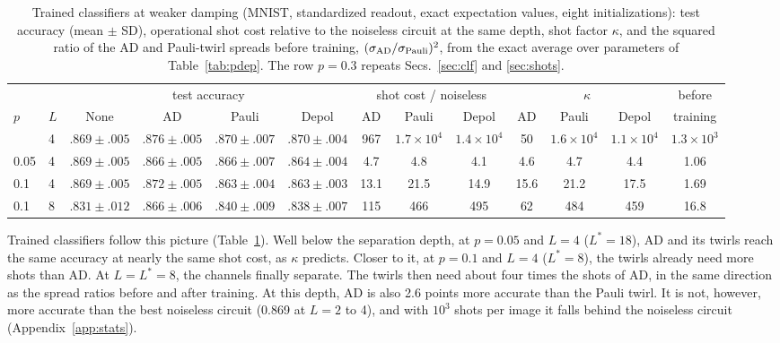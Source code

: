 \documentclass[
 aps,pra,
 twocolumn,
 superscriptaddress,
 longbibliography,
 nofootinbib
]{revtex4-2}
\newcommand{\AD}{\mathrm{AD}}
\begin{document}
\begin{table}[t]
\caption{Trained classifiers at weaker damping (MNIST, standardized readout,
exact expectation values, eight initializations): test accuracy (mean $\pm$ SD), operational
shot cost relative to the noiseless circuit at the same depth, shot factor
$\kappa$, and the squared ratio of the AD and Pauli-twirl spreads before
training, $(\sigma_{\AD}/\sigma_{\rm Pauli})^2$, from the exact average over
parameters of Table~\ref{tab:pdep}. The row $p=0.3$ repeats
Secs.~\ref{sec:clf} and \ref{sec:shots}.}
\label{tab:pdep_trained}
\begin{ruledtabular}
\begin{tabular}{llccccccccccc}
 & & \multicolumn{4}{c}{test accuracy} & \multicolumn{3}{c}{shot cost / noiseless} & \multicolumn{3}{c}{$\kappa$} & before\\
$p$ & $L$ & None & AD & Pauli & Depol & AD & Pauli & Depol & AD & Pauli & Depol & training\\
\colrule
0.3 & 4 & $.869\pm.005$ & $.876\pm.005$ & $.870\pm.007$ & $.870\pm.004$ & 967 & $1.7\times10^4$ & $1.4\times10^4$ & 50 & $1.6\times10^4$ & $1.1\times10^4$ & $1.3\times10^3$\\
0.05 & 4 & $.869\pm.005$ & $.866\pm.005$ & $.866\pm.007$ & $.864\pm.004$ & 4.7 & 4.8 & 4.1 & 4.6 & 4.7 & 4.4 & 1.06\\
0.1 & 4 & $.869\pm.005$ & $.872\pm.005$ & $.863\pm.004$ & $.863\pm.003$ & 13.1 & 21.5 & 14.9 & 15.6 & 21.2 & 17.5 & 1.69\\
0.1 & 8 & $.831\pm.012$ & $.866\pm.006$ & $.840\pm.009$ & $.838\pm.007$ & 115 & 466 & 495 & 62 & 484 & 459 & 16.8\\
\end{tabular}
\end{ruledtabular}
\end{table}

Trained classifiers follow this picture (Table~\ref{tab:pdep_trained}). Well
below the separation depth, at $p=0.05$ and $L=4$ ($L^*=18$), AD and its twirls
reach the same accuracy at nearly the same shot cost, as $\kappa$ predicts.
Closer to it, at $p=0.1$ and $L=4$ ($L^*=8$), the twirls already need more shots
than AD. At $L=L^*=8$, the channels finally separate. The twirls then need
about four times the shots of AD, in the same direction as the spread ratios
before and after training. At this depth, AD is also 2.6 points more accurate
than the Pauli twirl. It is not, however, more accurate than the best noiseless
circuit (0.869 at $L=2$ to 4), and with $10^3$ shots per image it falls behind
the noiseless circuit (Appendix~\ref{app:stats}).
\end{document}
